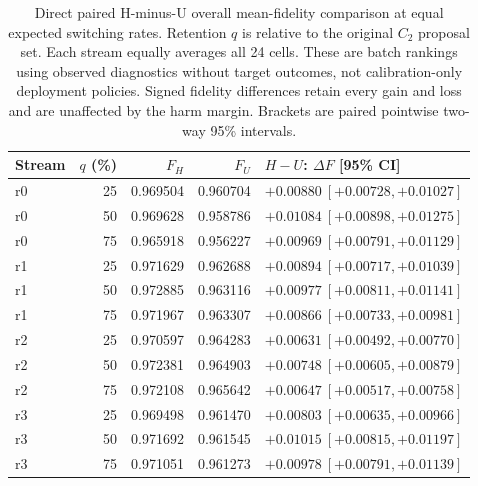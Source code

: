 \begin{table}[ht]
\centering
\scriptsize
\setlength{\tabcolsep}{3pt}
\caption{Direct paired H-minus-U overall mean-fidelity comparison at equal expected switching rates. Retention $q$ is relative to the original $C_2$ proposal set. Each stream equally averages all 24 cells. These are batch rankings using observed diagnostics without target outcomes, not calibration-only deployment policies. Signed fidelity differences retain every gain and loss and are unaffected by the harm margin. Brackets are paired pointwise two-way 95\% intervals.}
\label{tab:r4-h-u-fidelity}
\begin{tabular}{@{}lrrrl@{}}
\toprule
Stream & $q$ (\%) & $F_H$ & $F_U$ & $H-U$: $\Delta F$ [95\% CI] \\
\midrule
r0 & 25 & 0.969504 & 0.960704 & $+0.00880\ [+0.00728,+0.01027]$ \\
r0 & 50 & 0.969628 & 0.958786 & $+0.01084\ [+0.00898,+0.01275]$ \\
r0 & 75 & 0.965918 & 0.956227 & $+0.00969\ [+0.00791,+0.01129]$ \\
r1 & 25 & 0.971629 & 0.962688 & $+0.00894\ [+0.00717,+0.01039]$ \\
r1 & 50 & 0.972885 & 0.963116 & $+0.00977\ [+0.00811,+0.01141]$ \\
r1 & 75 & 0.971967 & 0.963307 & $+0.00866\ [+0.00733,+0.00981]$ \\
r2 & 25 & 0.970597 & 0.964283 & $+0.00631\ [+0.00492,+0.00770]$ \\
r2 & 50 & 0.972381 & 0.964903 & $+0.00748\ [+0.00605,+0.00879]$ \\
r2 & 75 & 0.972108 & 0.965642 & $+0.00647\ [+0.00517,+0.00758]$ \\
r3 & 25 & 0.969498 & 0.961470 & $+0.00803\ [+0.00635,+0.00966]$ \\
r3 & 50 & 0.971692 & 0.961545 & $+0.01015\ [+0.00815,+0.01197]$ \\
r3 & 75 & 0.971051 & 0.961273 & $+0.00978\ [+0.00791,+0.01139]$ \\
\bottomrule
\end{tabular}
\end{table}
